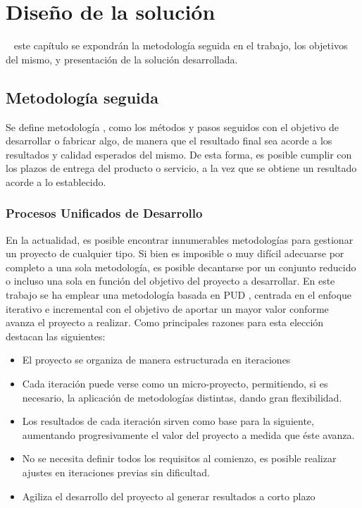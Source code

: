 \chapter{Diseño de la solución}

\vspace{-30pt}

~ este capítulo se expondrán la metodología seguida en el trabajo, los objetivos del mismo, y presentación de la solución desarrollada.

\section{Metodología seguida}
Se define metodología \cite{metodologiaRAE}, como los métodos y pasos seguidos con el objetivo de desarrollar o fabricar algo, de manera que el resultado final sea acorde a los resultados y calidad esperados del mismo. De esta forma, es posible cumplir con los plazos de entrega del producto o servicio, a la vez que se obtiene un resultado acorde a lo establecido. 

\subsection{Procesos Unificados de Desarrollo}
En la actualidad, es posible encontrar innumerables metodologías para gestionar un proyecto de cualquier tipo. Si bien es imposible o muy difícil adecuarse por completo a una sola metodología, es posible decantarse por un conjunto reducido o incluso una sola en función del objetivo del proyecto a desarrollar. En este trabajo se ha emplear una metodología basada en \ac{PUD} \cite{libro-PUD} \cite{PUD-2}, centrada en el enfoque iterativo e incremental con el objetivo de aportar un mayor valor conforme avanza el proyecto a realizar. Como principales razones para esta elección destacan las siguientes:

\begin{itemize}
\item El proyecto se organiza de manera estructurada en iteraciones 
\item Cada iteración puede verse como un micro-proyecto, permitiendo, si es necesario, la aplicación de metodologías distintas, dando gran flexibilidad.
\item Los resultados de cada iteración sirven como base para la siguiente, aumentando progresivamente el valor del proyecto a medida que éste avanza.
\item No se necesita definir todos los requisitos al comienzo, es posible realizar ajustes en iteraciones previas sin dificultad.
\item Agiliza el desarrollo del proyecto al generar resultados a corto plazo
\end{itemize}


